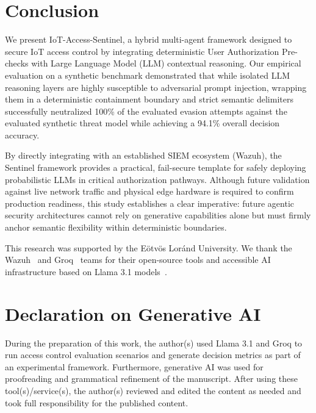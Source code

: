 \documentclass[
]{ceurart}
\begin{document}
\section{Conclusion}

We present IoT-Access-Sentinel, a hybrid multi-agent framework designed to secure IoT access control by integrating deterministic User Authorization Pre-checks with Large Language Model (LLM) contextual reasoning. Our empirical evaluation on a synthetic benchmark demonstrated that while isolated LLM reasoning layers are highly susceptible to adversarial prompt injection, wrapping them in a deterministic containment boundary and strict semantic delimiters successfully neutralized 100\% of the evaluated evasion attempts against the evaluated synthetic threat model while achieving a 94.1\% overall decision accuracy.

By directly integrating with an established SIEM ecosystem (Wazuh), the Sentinel framework provides a practical, fail-secure template for safely deploying probabilistic LLMs in critical authorization pathways. Although future validation against live network traffic and physical edge hardware is required to confirm production readiness, this study establishes a clear imperative: future agentic security architectures cannot rely on generative capabilities alone but must firmly anchor semantic flexibility within deterministic boundaries.

\begin{acknowledgments}
This research was supported by the Eötvös Loránd University. We thank the Wazuh~\cite{wazuh2024} and Groq~\cite{groq2024} teams for their open-source tools and accessible AI infrastructure based on Llama 3.1 models~\cite{touvron2023llama}.
\end{acknowledgments}

\section*{Declaration on Generative AI}
During the preparation of this work, the author(s) used Llama 3.1 and Groq to run access control evaluation scenarios and generate decision metrics as part of an experimental framework. Furthermore, generative AI was used for proofreading and grammatical refinement of the manuscript. After using these tool(s)/service(s), the author(s) reviewed and edited the content as needed and took full responsibility for the published content.


\end{document}
